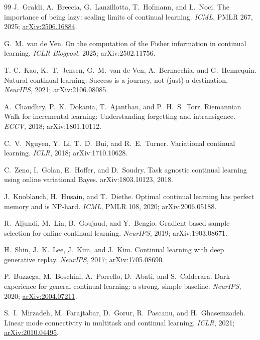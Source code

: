 \documentclass[11pt]{article}
\begin{document}
\begin{thebibliography}{99}
 J.~Graldi, A.~Breccia, G.~Lanzillotta,
T.~Hofmann, and L.~Noci.
The importance of being lazy: scaling limits of continual learning.
\emph{ICML}, PMLR 267, 2025;
\href{https://arxiv.org/abs/2506.16884}{arXiv:2506.16884}.

 G.~M.~van de Ven.
On the computation of the Fisher information in continual learning.
\emph{ICLR Blogpost}, 2025; arXiv:2502.11756.

 T.-C.~Kao, K.~T.~Jensen, G.~M.~van de Ven,
A.~Bernacchia, and G.~Hennequin.
Natural continual learning: Success is a journey, not (just) a destination.
\emph{NeurIPS}, 2021; arXiv:2106.08085.

 A.~Chaudhry, P.~K.~Dokania,
T.~Ajanthan, and P.~H.~S.~Torr.
Riemannian Walk for incremental learning: Understanding forgetting and
intransigence.
\emph{ECCV}, 2018; arXiv:1801.10112.

 C.~V.~Nguyen, Y.~Li, T.~D.~Bui, and
R.~E.~Turner.
Variational continual learning.
\emph{ICLR}, 2018; arXiv:1710.10628.

 C.~Zeno, I.~Golan, E.~Hoffer, and D.~Soudry.
Task agnostic continual learning using online variational Bayes.
arXiv:1803.10123, 2018.

 J.~Knoblauch, H.~Husain, and T.~Diethe.
Optimal continual learning has perfect memory and is NP-hard.
\emph{ICML}, PMLR 108, 2020; arXiv:2006.05188.

 R.~Aljundi, M.~Lin, B.~Goujaud, and Y.~Bengio.
Gradient based sample selection for online continual learning.
\emph{NeurIPS}, 2019; arXiv:1903.08671.

H.~Shin, J.~K.~Lee, J.~Kim, and J.~Kim.
Continual learning with deep generative replay.
\emph{NeurIPS}, 2017;
\href{https://arxiv.org/abs/1705.08690}{arXiv:1705.08690}.

P.~Buzzega, M.~Boschini, A.~Porrello, D.~Abati, and S.~Calderara.
Dark experience for general continual learning: a strong, simple baseline.
\emph{NeurIPS}, 2020;
\href{https://arxiv.org/abs/2004.07211}{arXiv:2004.07211}.

S.~I.~Mirzadeh, M.~Farajtabar, D.~Gorur, R.~Pascanu, and
H.~Ghasemzadeh.
Linear mode connectivity in multitask and continual learning.
\emph{ICLR}, 2021;
\href{https://arxiv.org/abs/2010.04495}{arXiv:2010.04495}.


\end{thebibliography}
\end{document}
